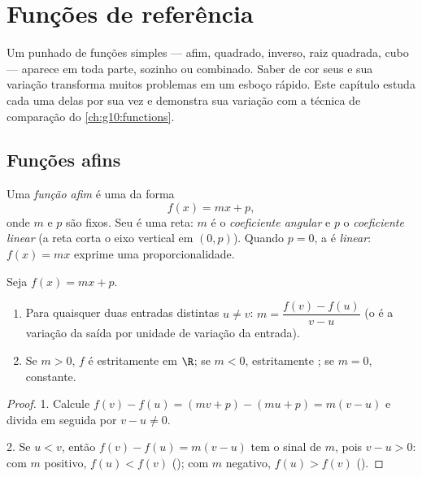 \chapter{Funções de referência}\label{ch:g10:reffunc}

Um punhado de funções simples --- afim, quadrado, inverso, raiz quadrada,
cubo --- aparece em toda parte, sozinho ou combinado. Saber de cor seus
 e sua variação transforma muitos problemas em um esboço rápido.
Este capítulo estuda cada uma delas por sua vez e demonstra sua variação
com a técnica de comparação do \cref{ch:g10:functions}.

\section{Funções afins}

\begin{definition}\label{def:g10:reffunc:affine}
Uma \emph{função afim} é uma  da forma
\[
f(x) = mx + p,
\]
onde $m$ e $p$ são  fixos. Seu  é uma reta: $m$ é o
\emph{coeficiente angular} e $p$ o
\emph{coeficiente linear} (a reta corta o eixo
vertical em $(0, p)$). Quando $p = 0$, a  é \emph{linear}:
$f(x) = mx$ exprime uma proporcionalidade.
\end{definition}

\begin{proposition}\label{prop:g10:reffunc:affine}
Seja $f(x) = mx + p$.
\begin{enumerate}
  \item Para quaisquer duas entradas distintas $u \neq v$:
        $m = \dfrac{f(v) - f(u)}{v - u}$ (o  é a
        variação da saída por unidade de variação da entrada).
  \item Se $m > 0$, $f$ é estritamente  em $\R$; se $m < 0$,
        estritamente ; se $m = 0$, constante.
\end{enumerate}
\end{proposition}

\begin{proof}
1. Calcule $f(v) - f(u) = (mv + p) - (mu + p) = m(v - u)$ e divida em
seguida por $v - u \neq 0$.

2. Se $u < v$, então $f(v) - f(u) = m(v-u)$ tem o sinal de $m$, pois
$v - u > 0$: com $m$ positivo, $f(u) < f(v)$ (); com $m$
negativo, $f(u) > f(v)$ ().
\end{proof}

